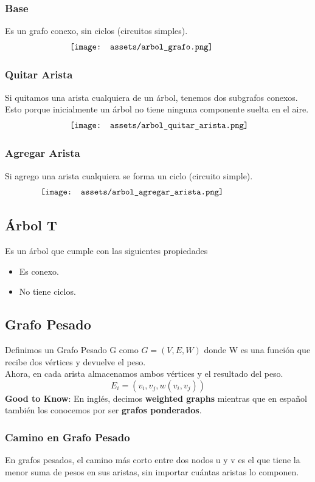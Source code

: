 \documentclass[10pt,a4paper]{article}
\begin{document}
\subsubsection*{Base}
Es un grafo conexo, sin ciclos (circuitos simples).
\[\begin{minipage}[b]{0.6\textwidth}
    \texttt{[image: assets/arbol\_grafo.png]}
\end{minipage}\]
\subsubsection*{Quitar Arista}
Si quitamos una arista cualquiera de un árbol, tenemos dos subgrafos conexos. Esto porque inicialmente un árbol no tiene ninguna componente suelta en el aire. 
\[\begin{minipage}[b]{0.6\textwidth}
    \texttt{[image: assets/arbol\_quitar\_arista.png]}
\end{minipage}\]
\subsubsection*{Agregar Arista}
Si agrego una arista cualquiera se forma un ciclo (circuito simple).
\[\begin{minipage}[b]{0.8\textwidth}
    \texttt{[image: assets/arbol\_agregar\_arista.png]}
\end{minipage}\]
\subsection*{Árbol T}
Es un árbol que cumple con las siguientes propiedades
\begin{itemize}
    \item Es conexo.
    \item No tiene ciclos. 
\end{itemize}
\subsection*{Grafo Pesado}
Definimos un Grafo Pesado G como $G = (V, E, W)$ donde W es una función que recibe dos vértices y devuelve el peso. \\
Ahora, en cada arista almacenamos ambos vértices y el resultado del peso. 
\[E_{i} = (v_{i}, v_{j}, w(v_{i},v_{j}))\]
\textbf{Good to Know}: En inglés, decimos \textbf{weighted graphs} mientras que en español también los conocemos por ser \textbf{grafos ponderados}.
\subsubsection*{Camino en Grafo Pesado}
En grafos pesados, el camino más corto entre dos nodos u y v es el que tiene la menor suma de pesos en sus aristas, sin importar cuántas aristas lo componen.
\end{document}
